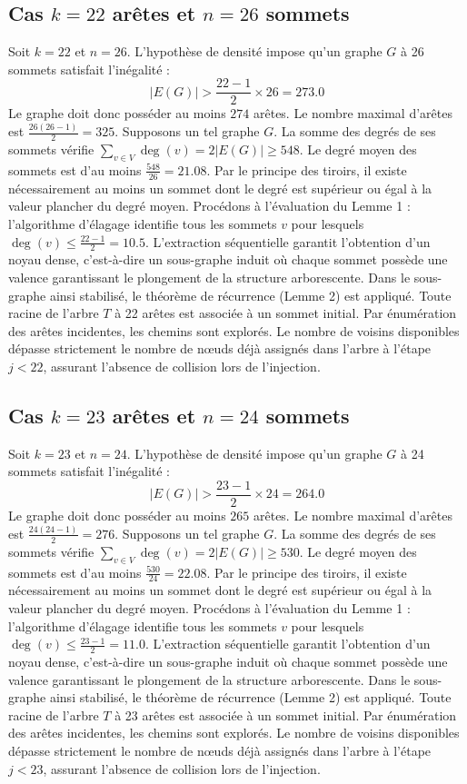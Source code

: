 \documentclass[12pt,a4paper]{article}
\begin{document}
\subsection{Cas $k = 22$ arêtes et $n = 26$ sommets}
Soit $k = 22$ et $n = 26$. L'hypothèse de densité impose qu'un graphe $G$ à 26 sommets satisfait l'inégalité :
$$ |E(G)| > \frac{22-1}{2} \times 26 = 273.0 $$
Le graphe doit donc posséder au moins $274$ arêtes. Le nombre maximal d'arêtes est $\frac{26(26-1)}{2} = 325$.
Supposons un tel graphe $G$. La somme des degrés de ses sommets vérifie $\sum_{v \in V} \deg(v) = 2|E(G)| \geq 548$.
Le degré moyen des sommets est d'au moins $\frac{548}{26} = 21.08$.
Par le principe des tiroirs, il existe nécessairement au moins un sommet dont le degré est supérieur ou égal à la valeur plancher du degré moyen.
Procédons à l'évaluation du Lemme 1 : l'algorithme d'élagage identifie tous les sommets $v$ pour lesquels $\deg(v) \leq \frac{22-1}{2} = 10.5$.
L'extraction séquentielle garantit l'obtention d'un noyau dense, c'est-à-dire un sous-graphe induit où chaque sommet possède une valence garantissant le plongement de la structure arborescente.
Dans le sous-graphe ainsi stabilisé, le théorème de récurrence (Lemme 2) est appliqué. Toute racine de l'arbre $T$ à 22 arêtes est associée à un sommet initial. Par énumération des arêtes incidentes, les chemins sont explorés. Le nombre de voisins disponibles dépasse strictement le nombre de nœuds déjà assignés dans l'arbre à l'étape $j < 22$, assurant l'absence de collision lors de l'injection.

\subsection{Cas $k = 23$ arêtes et $n = 24$ sommets}
Soit $k = 23$ et $n = 24$. L'hypothèse de densité impose qu'un graphe $G$ à 24 sommets satisfait l'inégalité :
$$ |E(G)| > \frac{23-1}{2} \times 24 = 264.0 $$
Le graphe doit donc posséder au moins $265$ arêtes. Le nombre maximal d'arêtes est $\frac{24(24-1)}{2} = 276$.
Supposons un tel graphe $G$. La somme des degrés de ses sommets vérifie $\sum_{v \in V} \deg(v) = 2|E(G)| \geq 530$.
Le degré moyen des sommets est d'au moins $\frac{530}{24} = 22.08$.
Par le principe des tiroirs, il existe nécessairement au moins un sommet dont le degré est supérieur ou égal à la valeur plancher du degré moyen.
Procédons à l'évaluation du Lemme 1 : l'algorithme d'élagage identifie tous les sommets $v$ pour lesquels $\deg(v) \leq \frac{23-1}{2} = 11.0$.
L'extraction séquentielle garantit l'obtention d'un noyau dense, c'est-à-dire un sous-graphe induit où chaque sommet possède une valence garantissant le plongement de la structure arborescente.
Dans le sous-graphe ainsi stabilisé, le théorème de récurrence (Lemme 2) est appliqué. Toute racine de l'arbre $T$ à 23 arêtes est associée à un sommet initial. Par énumération des arêtes incidentes, les chemins sont explorés. Le nombre de voisins disponibles dépasse strictement le nombre de nœuds déjà assignés dans l'arbre à l'étape $j < 23$, assurant l'absence de collision lors de l'injection.
\end{document}
